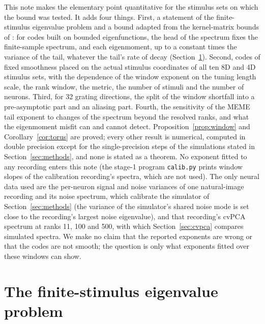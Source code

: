 \documentclass[11pt]{article}
\theoremstyle{definition}
\begin{document}
This note makes the elementary point quantitative for the stimulus sets on which the bound was tested. It adds four things. First, a statement of the finite-stimulus eigenvalue problem and a bound adapted from the kernel-matrix bounds of \cite{braun2006}: for codes built on bounded eigenfunctions, the head of the spectrum fixes the finite-sample spectrum, and each eigenmoment, up to a constant times the variance of the tail, whatever the tail's rate of decay (Section~\ref{sec:theory}). Second, codes of fixed smoothness placed on the actual stimulus coordinates of all ten 8D and 4D stimulus sets, with the dependence of the window exponent on the tuning length scale, the rank window, the metric, the number of stimuli and the number of neurons. Third, for 32 grating directions, the split of the window shortfall into a pre-asymptotic part and an aliasing part. Fourth, the sensitivity of the MEME tail exponent to changes of the spectrum beyond the resolved ranks, and what the eigenmoment misfit can and cannot detect. Proposition~\ref{prop:window} and Corollary~\ref{cor:torus} are proved; every other result is numerical, computed in double precision except for the single-precision steps of the simulations stated in Section~\ref{sec:methods}, and none is stated as a theorem. No exponent fitted to any recording enters this note (the stage-1 program \texttt{calib.py} prints window slopes of the calibration recording's spectra, which are not used). The only neural data used are the per-neuron signal and noise variances of one natural-image recording and its noise spectrum, which calibrate the simulator of Section~\ref{sec:methods} (the variance of the simulator's shared noise mode is set close to the recording's largest noise eigenvalue), and that recording's cvPCA spectrum at ranks 11, 100 and 500, with which Section~\ref{sec:cvpca} compares simulated spectra. We make no claim that the reported exponents are wrong or that the codes are not smooth; the question is only what exponents fitted over these windows can show.

\section{The finite-stimulus eigenvalue problem}\label{sec:theory}
\end{document}
